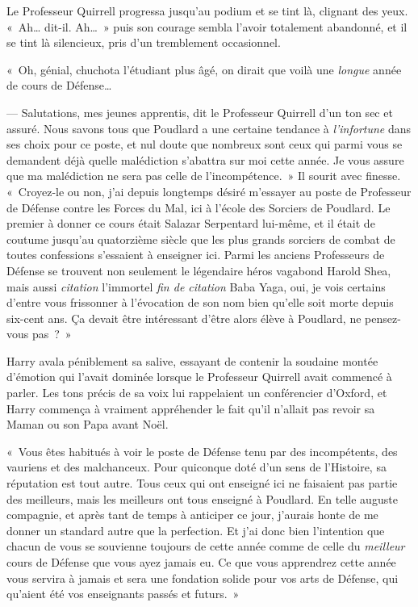 Le Professeur Quirrell progressa jusqu'au podium et se tint là, clignant des yeux. «~Ah… dit-il. Ah…~» puis son courage sembla l'avoir totalement abandonné, et il se tint là silencieux, pris d'un tremblement occasionnel.

«~Oh, génial, chuchota l'étudiant plus âgé, on dirait que voilà une \emph{longue} année de cours de Défense…

--- Salutations, mes jeunes apprentis, dit le Professeur Quirrell d'un ton sec et assuré. Nous savons tous que Poudlard a une certaine tendance à \emph{l'infortune} dans ses choix pour ce poste, et nul doute que nombreux sont ceux qui parmi vous se demandent déjà quelle malédiction s'abattra sur moi cette année. Je vous assure que ma malédiction ne sera pas celle de l'incompétence.~» Il sourit avec finesse. «~Croyez-le ou non, j'ai depuis longtemps désiré m'essayer au poste de Professeur de Défense contre les Forces du Mal, ici à l'école des Sorciers de Poudlard. Le premier à donner ce cours était Salazar Serpentard lui-même, et il était de coutume jusqu'au quatorzième siècle que les plus grands sorciers de combat de toutes confessions s'essaient à enseigner ici. Parmi les anciens Professeurs de Défense se trouvent non seulement le légendaire héros vagabond Harold Shea, mais aussi \emph{citation} l'immortel \emph{fin de citation} Baba Yaga, oui, je vois certains d'entre vous frissonner à l'évocation de son nom bien qu'elle soit morte depuis six-cent ans. Ça devait être intéressant d'être alors élève à Poudlard, ne pensez-vous pas~?~»

Harry avala péniblement sa salive, essayant de contenir la soudaine montée d'émotion qui l'avait dominée lorsque le Professeur Quirrell avait commencé à parler. Les tons précis de sa voix lui rappelaient un conférencier d'Oxford, et Harry commença à vraiment appréhender le fait qu'il n'allait pas revoir sa Maman ou son Papa avant Noël.

«~Vous êtes habitués à voir le poste de Défense tenu par des incompétents, des vauriens et des malchanceux. Pour quiconque doté d'un sens de l'Histoire, sa réputation est tout autre. Tous ceux qui ont enseigné ici ne faisaient pas partie des meilleurs, mais les meilleurs ont tous enseigné à Poudlard. En telle auguste compagnie, et après tant de temps à anticiper ce jour, j'aurais honte de me donner un standard autre que la perfection. Et j'ai donc bien l'intention que chacun de vous se souvienne toujours de cette année comme de celle du \emph{meilleur} cours de Défense que vous ayez jamais eu. Ce que vous apprendrez cette année vous servira à jamais et sera une fondation solide pour vos arts de Défense, qui qu'aient été vos enseignants passés et futurs.~»

